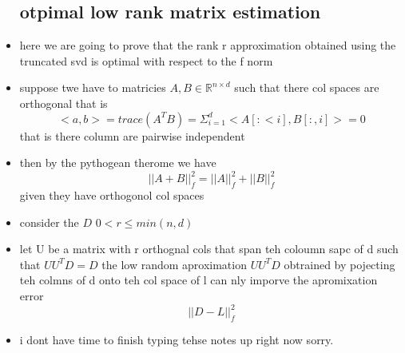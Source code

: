 \documentclass{article}
\begin{document}
\begin{itemize}
\subsection{otpimal low rank matrix estimation}
\item here we are going to prove that the rank r approximation obtained using the truncated svd is optimal with respect to the f norm 
\item suppose twe have to matricies $A,B\in \mathbb{R}^{n\times d}$ such that there col spaces are orthogonal that is $$<a,b>=trace(A^TB)=\Sigma_{i=1}^{d}<A[:<i], B[:,i]>=0$$ that is there column are pairwise independent 
\item then by the pythogean therome we have $$||A+B||_{f}^{2}=||A||_{f}^{2}+||B||_{f}^{2}$$ given they have orthogonol col spaces
\item consider the  $D$ $0<r\leq min(n,d)$
\item let U be a matrix with r orthognal cols that span teh coloumn sapc of d such that $UU^TD=D$ the low random aproximation $UU^TD$ obtrained by pojecting teh colmns of d onto teh col space of l can nly imporve the apromixation error 
$$||D-L||_{f}^{2}$$
\item i dont have time to finish typing tehse notes up right now sorry. 

\end{itemize}
\end{document}
